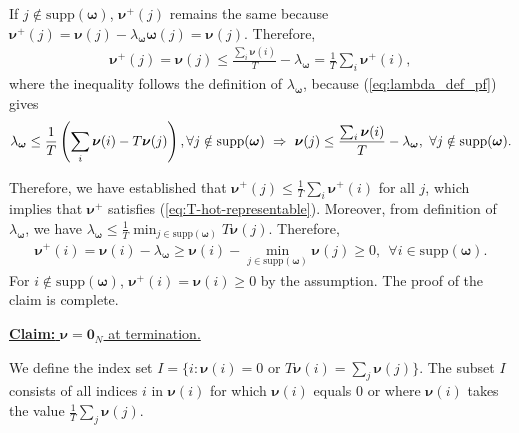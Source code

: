 \documentclass[11pt,letterpaper]{article}
\newcommand{\supp}{\mathrm{supp}}
\begin{document}
If $j \notin \supp(\boldsymbol{\omega})$, $\boldsymbol{\nu}^{+}(j)$ remains the same because $\boldsymbol{\nu}^{+}(j) = \boldsymbol{\nu}(j) - \lambda_{\boldsymbol{\omega}}\boldsymbol{\omega}(j) = \boldsymbol{\nu}(j)$. Therefore,
\begin{align}
    \boldsymbol{\nu}^{+}(j) = \boldsymbol{\nu}(j) \leq \frac{\sum_i \boldsymbol{\nu}(i)}{T} - \lambda_{\boldsymbol{\omega}} = \frac{1}{T} \sum_i \boldsymbol{\nu}^+(i) \label{eq:at_in_A_pf2},
\end{align}
where the inequality 
follows the definition of $\lambda_{\boldsymbol{\omega}}$, because (\ref{eq:lambda_def_pf}) gives
\begin{align}
     \lambda_{\boldsymbol{\omega}} \leq \frac{1}{T} \left( \sum_i \boldsymbol{\nu}(i) - T\boldsymbol{\nu}(j)\right), \forall j \notin \supp(\boldsymbol{\omega})~ \Rightarrow ~ \boldsymbol{\nu}(j) \leq \frac{\sum_i \boldsymbol{\nu}(i)}{T} - \lambda_{\boldsymbol{\omega}}, ~ \forall j \notin \supp(\boldsymbol{\omega}). \notag
\end{align}

Therefore, we have established that $\boldsymbol{\nu}^+(j) \leq \frac{1}{T} \sum_i \boldsymbol{\nu}^+(i)$ for all $j$, which implies that $\boldsymbol{\nu}^+$ satisfies (\ref{eq:T-hot-representable}). Moreover, from definition of $\lambda_{\boldsymbol{\omega}}$, we have $\lambda_{\boldsymbol{\omega}} \leq  \tfrac{1}{T}\min_{j \in \supp(\boldsymbol{\omega})}T\boldsymbol{\nu}(j)$. Therefore,   
\begin{align}
    \boldsymbol{\nu}^+(i)=\boldsymbol{\nu}(i) - \lambda_{\boldsymbol{\omega}} \geq \boldsymbol{\nu}(i) - \min_{j \in \supp(\boldsymbol{\omega})}\boldsymbol{\nu}(j) \geq 0, ~~\forall i \in \supp(\boldsymbol{\omega}). \label{eq:at_non-neg}
\end{align}
For $i\notin\supp(\boldsymbol{\omega})$, $\boldsymbol{\nu}^+(i)=\boldsymbol{\nu}(i)\geq 0$ by the assumption. The proof of the claim is complete. 


\underline{\textbf{Claim:} $\boldsymbol{\nu}=\mathbf{0}_N$ at termination.}


We define the index set $I = \{i : \boldsymbol{\nu}(i) = 0 \text{ or } T\boldsymbol{\nu}(i) = \sum_j \boldsymbol{\nu}(j)\}$. The subset $I$ consists of all indices $i$ in $\boldsymbol{\nu}(i)$ for which  $\boldsymbol{\nu}(i)$ equals $0$ or where $\boldsymbol{\nu}(i)$ takes the value $\frac{1}{T}\sum_j \boldsymbol{\nu}(j)$.
\end{document}
